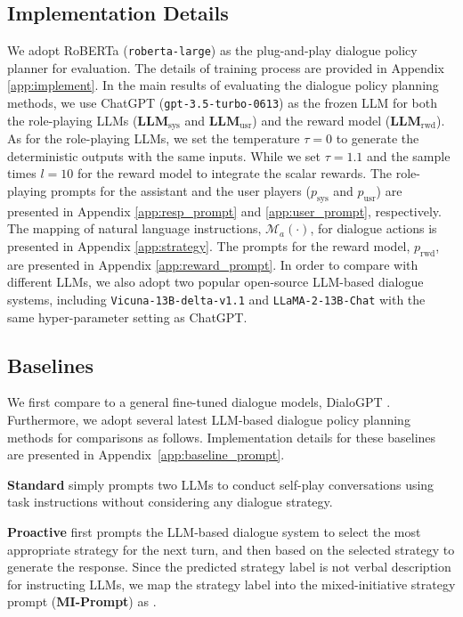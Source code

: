\documentclass{article} %
\begin{document}
\subsection{Implementation Details}
We adopt RoBERTa (\texttt{roberta-large}) as the plug-and-play dialogue policy planner for evaluation.  
The details of training process are provided in Appendix \ref{app:implement}.
In the main results of evaluating the dialogue policy planning methods, we use ChatGPT (\texttt{gpt-3.5-turbo-0613}) as the frozen LLM for both the role-playing LLMs ($\mathbf{LLM}_\text{sys}$ and $\mathbf{LLM}_\text{usr}$) and the reward model ($\mathbf{LLM}_\text{rwd}$). As for the role-playing LLMs, we set the temperature $\tau=0$ to generate the deterministic outputs with the same inputs. While we set $\tau=1.1$ and the sample times $l=10$ for the reward model to integrate the scalar rewards. 
The role-playing prompts for the assistant and the user players ($p_\text{sys}$ and $p_\text{usr}$) are presented in Appendix \ref{app:resp_prompt} and \ref{app:user_prompt}, respectively. 
The mapping of natural language instructions, $\mathcal{M}_a(\cdot)$, for dialogue actions is presented in Appendix \ref{app:strategy}. 
The prompts for the reward model, $p_\text{rwd}$, are presented in Appendix \ref{app:reward_prompt}. 
In order to compare with different LLMs, we also adopt two popular open-source LLM-based dialogue systems, including \texttt{Vicuna-13B-delta-v1.1} and \texttt{LLaMA-2-13B-Chat} with the same hyper-parameter setting as ChatGPT. 


\subsection{Baselines}
We first compare to a general fine-tuned dialogue models, DialoGPT \citep{dialogpt}. Furthermore, we adopt several latest LLM-based dialogue policy planning methods for comparisons as follows.  Implementation details for these baselines are presented in Appendix~\ref{app:baseline_prompt}.  

\noindent \textbf{Standard} simply prompts two LLMs to conduct self-play conversations using task instructions without considering any dialogue strategy. 

\noindent \textbf{Proactive} \citet{llm-proactive} first prompts the LLM-based dialogue system to select the most appropriate strategy for the next turn, and then based on the selected strategy to generate the response. Since the predicted strategy label is not verbal description for instructing LLMs, we map the strategy label into the mixed-initiative strategy prompt (\textbf{MI-Prompt}) as \citet{acl23-mixed}. 
\end{document}
